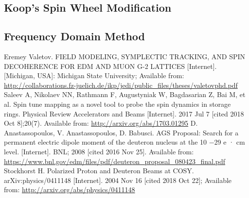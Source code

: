 \documentclass{article}
\begin{document}
\subsection{Koop's Spin Wheel Modification}

\subsection{Frequency Domain Method}

\begin{thebibliography}{99}
  Eremey Valetov. FIELD MODELING, SYMPLECTIC TRACKING, AND SPIN DECOHERENCE FOR EDM AND MUON G-2 LATTICES [Internet]. [Michigan, USA]: Michigan State University; Available from: \url{http://collaborations.fz-juelich.de/ikp/jedi/public_files/theses/valetovphd.pdf}
  Saleev A, Nikolaev NN, Rathmann F, Augustyniak W, Bagdasarian Z, Bai M, et al. Spin tune mapping as a novel tool to probe the spin dynamics in storage rings. Physical Review Accelerators and Beams [Internet]. 2017 Jul 7 [cited 2018 Oct 8];20(7). Available from: \url{http://arxiv.org/abs/1703.01295}
  D. Anastassopoulos, V. Anastassopoulos, D. Babusci. AGS Proposal: Search for a permanent electric dipole moment of the deuteron nucleus at the 10 −29 e · cm level. [Internet]. BNL; 2008 [cited 2016 Nov 25]. Available from: \url{https://www.bnl.gov/edm/files/pdf/deuteron_proposal_080423_final.pdf}
  Stockhorst H. Polarized Proton and Deuteron Beams at COSY. arXiv:physics/0411148 [Internet]. 2004 Nov 16 [cited 2018 Oct 22]; Available from: \url{http://arxiv.org/abs/physics/0411148}


\end{thebibliography}
\end{document}
